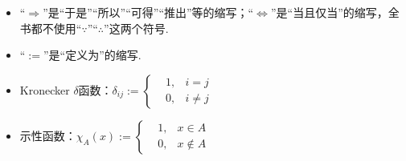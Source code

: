 \documentclass[main.tex]{subfiles}
\begin{document}
\begin{itemize}
    \item “\(\Longrightarrow\)”是“于是”“所以”“可得”“推出”等的缩写；“\(\Longleftrightarrow\)”是“当且仅当”的缩写，全书都不使用“\(\because\)”“\(\therefore\)”这两个符号.
    \item “\(:=\)”是“定义为”的缩写.
    \item Kronecker \(\delta\)函数：\(\delta_{ij}:=\left\{\begin{aligned} & 1, & i=j \\ & 0, &i \neq j \end{aligned}\right.\)
    \item 示性函数：\(\chi_A(x) := \left\{\begin{aligned} & 1, & x \in A \\ & 0, &x \not \in A \end{aligned}\right.\) 
\end{itemize}
\end{document}
